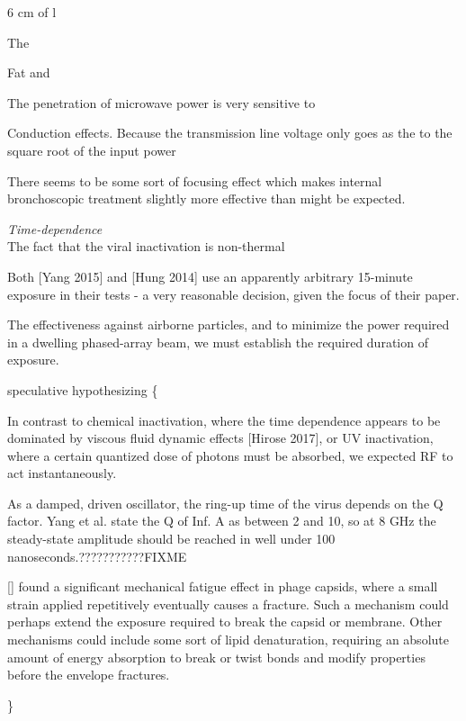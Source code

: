 \documentclass[fleqn,10pt]{article}
\begin{document}
6 cm of l

The 

Fat and 

The penetration of microwave power is very sensitive to 

Conduction effects. Because the transmission line voltage only goes as the to the square root of the input power

There seems to be some sort of focusing effect which makes internal bronchoscopic treatment slightly more effective than might be expected.

\clearpage
\printbibliography[heading=none, title={}, keyword={standards}]



\clearpage
{\Large \it Time-dependence}\\

The fact that the viral inactivation is non-thermal

Both [Yang 2015] and [Hung 2014] use an apparently arbitrary 15-minute exposure in their tests - a very reasonable decision, given the focus of their paper. 

The effectiveness against airborne particles, and to minimize the power required in a dwelling phased-array beam, we must establish the required duration of exposure.

{\color{red} speculative hypothesizing \{ } 

In contrast to chemical inactivation, where the time dependence appears to be dominated by viscous fluid dynamic effects [Hirose 2017], or UV inactivation, where a certain quantized dose of photons must be absorbed, we expected RF to act instantaneously.

As a damped, driven oscillator, the ring-up time of the virus depends on the Q factor. Yang et al. state the Q of Inf. A as between 2 and 10, so at 8 GHz the steady-state amplitude should be reached in well under 100 nanoseconds.???????????FIXME

[] found a significant mechanical fatigue effect in phage capsids, where a small strain applied repetitively eventually causes a fracture. Such a mechanism could perhaps extend the exposure required to break the capsid or membrane. Other mechanisms could include some sort of lipid denaturation, requiring an absolute amount of energy absorption to break or twist bonds and modify properties before the envelope fractures.


{\color{red}  \} } 
\end{document}
